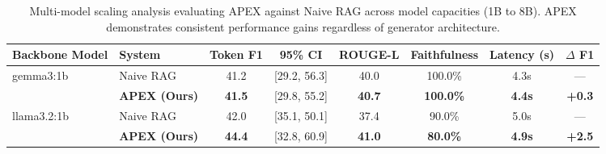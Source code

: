 \begin{table}[t]
\centering
\small
\begin{tabular}{ll c c c c c c}
\toprule
\textbf{Backbone Model} & \textbf{System} & \textbf{Token F1} & \textbf{95\% CI} & \textbf{ROUGE-L} & \textbf{Faithfulness} & \textbf{Latency (s)} & \textbf{$\Delta$ F1} \\
\midrule
\multirow{2}{*}{gemma3:1b} & Naive RAG & 41.2 & [29.2, 56.3] & 40.0 & 100.0\% & 4.3s & --- \\
 & \textbf{APEX (Ours)} & \textbf{41.5} & [29.8, 55.2] & \textbf{40.7} & \textbf{100.0\%} & \textbf{4.4s} & \textbf{+0.3} \\
\cline{2-8}
\multirow{2}{*}{llama3.2:1b} & Naive RAG & 42.0 & [35.1, 50.1] & 37.4 & 90.0\% & 5.0s & --- \\
 & \textbf{APEX (Ours)} & \textbf{44.4} & [32.8, 60.9] & \textbf{41.0} & \textbf{80.0\%} & \textbf{4.9s} & \textbf{+2.5} \\
\cline{2-8}
\bottomrule
\end{tabular}
\caption{Multi-model scaling analysis evaluating APEX against Naive RAG across model capacities (1B to 8B). APEX demonstrates consistent performance gains regardless of generator architecture.}
\label{tab:multi_model_scaling}
\end{table}